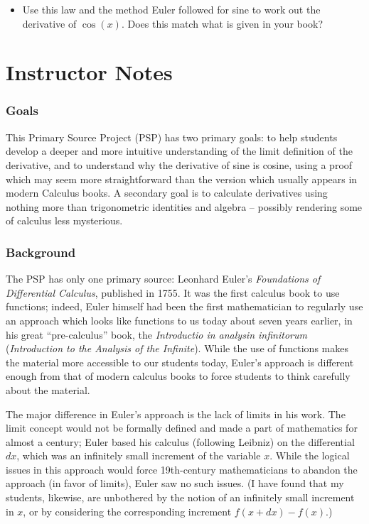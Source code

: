 \documentclass[11pt]{article}
\newcounter{tasknumb}
\newcommand{\tasknumb}{\stepcounter{tasknumb}\textmd{\textbf{$\fbox{$\fbox{Task \thetasknumb}$}$}}}
\newenvironment{task}%
 {\begin{itemize}
 \item[\tasknumb]  }
{
    \end{itemize}    }%
\begin{document}
\begin{task}
Use this law and the method Euler followed for sine to work out the derivative of $\cos(x)$.  Does this match what is given in your book?
\end{task}


{}


\vfill

\medskip

\newpage

\section*{Instructor Notes}

\subsubsection*{Goals}
This Primary Source Project (PSP) has two primary goals: to help students develop a deeper and more intuitive understanding of the limit definition of the derivative, and to understand why the derivative of sine is cosine, using a proof which may seem more straightforward than the version which usually appears in modern Calculus books. A secondary goal is to calculate derivatives using nothing more than trigonometric identities and algebra -- possibly rendering some of calculus less mysterious.

\subsubsection*{Background}
The PSP has only one primary source: Leonhard Euler's \emph{Foundations of Differential Calculus}, published in 1755.  It was the first calculus book to use functions; indeed, Euler himself had been the first mathematician to regularly use an approach which looks like functions to us today about seven years earlier, in his great ``pre-calculus'' book, the \emph{Introductio in analysin infinitorum} (\emph{Introduction to the Analysis of the Infinite}).  While the use of functions makes the material more accessible to our students today, Euler's approach is different enough from that of modern calculus books to force students to think carefully about the material.

The major difference in Euler's approach is the lack of limits in his work.  The limit concept would not be formally defined and made a part of mathematics for almost a century; Euler based his calculus (following Leibniz) on the differential $dx$, which was an infinitely small increment of the variable $x$.  While the logical issues in this approach would force 19th-century mathematicians to abandon the approach (in favor of limits), Euler saw no such issues.  (I have found that my students, likewise, are unbothered by the notion of an infinitely small increment in $x$, or by considering the corresponding increment $f(x + dx) - f(x)$.)
\end{document}
